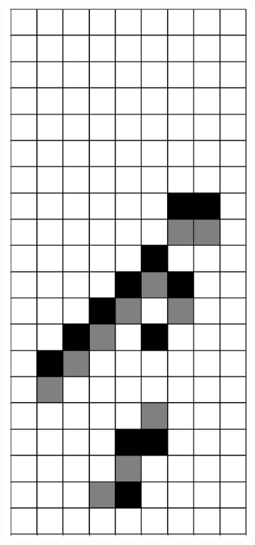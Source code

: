 \documentclass[12pt]{article}
\numberwithin{figure}{section} %
\begin{document}
\begin{figure}[H]
\begin{subfigure}{0.3\textwidth}
     		\subcaption{}
   	\end{subfigure}
        \begin{subfigure}{0.3\textwidth}
     		\centering
     		\includegraphics[angle=270,width=\linewidth]{Section4/22.2}

\end{subfigure}
\end{figure}
\end{document}
